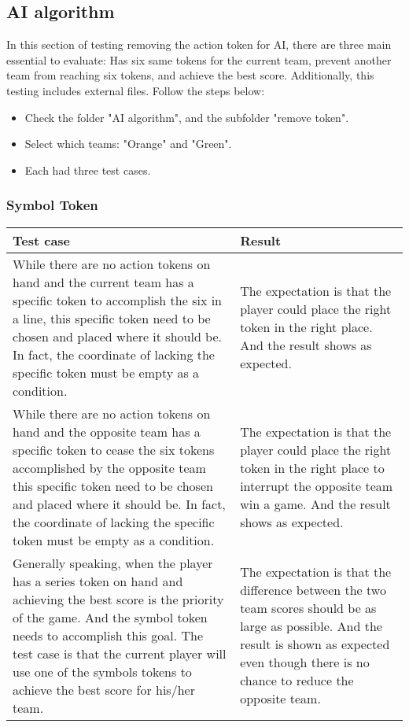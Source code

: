 \subsection{AI algorithm}
In this section of testing removing the action token for AI, there are three main essential to evaluate: Has six same tokens for the current team, prevent another team from reaching six tokens, and achieve the best score. Additionally, this testing includes external files. Follow the steps below: 

\begin{itemize}
	\item Check the folder "AI algorithm", and the subfolder "remove token".
	\item Select which teams: "Orange" and "Green".
	\item Each had three test cases. 
\end{itemize}


\subsubsection{Symbol Token}	

\begin{table}[h]
	\centering
	\begin{tabular}{p{7cm}@{\hskip 5mm}  p{7cm}} 
		\toprule
		Test case   & Result   \\ 
		\midrule
		\midrule
         While there are no action tokens on hand and the current team has a specific token to accomplish the six in a line, this specific token need to be chosen and placed where it should be. In fact, the coordinate of lacking the specific token must be empty as a condition. & The expectation is that the player could place the right token in the right place. And the result shows as expected. \\
		\midrule
	     While there are no action tokens on hand and the opposite team has a specific token to cease the six tokens accomplished by the opposite team  this specific token need to be chosen and placed where it should be. In fact, the coordinate of lacking the specific token must be empty as a condition. & The expectation is that the player could place the right token in the right place to interrupt the opposite team win a game. And the result shows as expected. \\
		\midrule
		 Generally speaking, when the player has a series token on hand and achieving the best score is the priority of the game. And the symbol token needs to accomplish this goal.  The test case is that the current player will use one of the symbols tokens to achieve the best score for his/her team. & The expectation is that the difference between the two team scores should be as large as possible. And the result is shown as expected even though there is no chance to reduce the opposite team.    \\
		\bottomrule
	\end{tabular}
\end{table}

